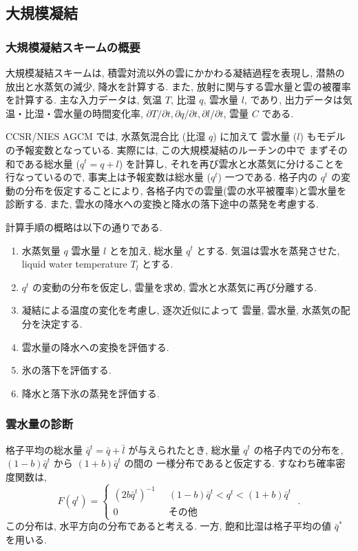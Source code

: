 ﻿
\subsection{大規模凝結}

\subsubsection{大規模凝結スキームの概要}

大規模凝結スキームは,
積雲対流以外の雲にかかわる凝結過程を表現し,
潜熱の放出と水蒸気の減少, 降水を計算する.
また, 放射に関与する雲水量と雲の被覆率を計算する.
主な入力データは, 気温 $T$, 比湿 $q$, 雲水量 $l$, であり,
出力データは気温・比湿・雲水量の時間変化率,
$\partial T/\partial t, \partial q/\partial t, \partial l/\partial t$,
雲量 $C$ である.

CCSR/NIES AGCM では, 水蒸気混合比 (比湿 $q$) に加えて
雲水量 ($l$) もモデルの予報変数となっている.
実際には, この大規模凝結のルーチンの中で
まずその和である総水量 ($q^t = q+l$) を計算し, 
それを再び雲水と水蒸気に分けることを行なっているので,
事実上は予報変数は総水量 ($q^t$) 一つである.
格子内の $q^t$ の変動の分布を仮定することにより,
各格子内での雲量(雲の水平被覆率)と雲水量を診断する.
また, 雲水の降水への変換と降水の落下途中の蒸発を考慮する.

計算手順の概略は以下の通りである.
%
\begin{enumerate}
\item 水蒸気量 $q$ 雲水量 $l$ とを加え,
      総水量 $q^t$ とする.
      気温は雲水を蒸発させた, 
      liquid water temperature  $T_l$ とする.
\item $q^t$ の変動の分布を仮定し,
      雲量を求め, 雲水と水蒸気に再び分離する.
\item 凝結による温度の変化を考慮し,
      逐次近似によって
      雲量, 雲水量, 水蒸気の配分を決定する.
\item 雲水量の降水への変換を評価する.
\item 氷の落下を評価する.
\item 降水と落下氷の蒸発を評価する.
\end{enumerate}

\subsubsection{雲水量の診断}

格子平均の総水量 $\bar{q}^t = \bar{q} + \bar{l}$ が与えられたとき,
総水量 $q^t$ の格子内での分布を,
$(1-b)\bar{q}^t$ から $(1+b)\bar{q}^t$ の間の
一様分布であると仮定する. すなわち確率密度関数は,
\begin{equation}
  F(q^t) = \left\{ 
           \begin{array}{ll}
             (2b\bar{q}^t)^{-1} \; \; &
                 (1-b)\bar{q}^t < q^t <  (1+b)\bar{q}^t \\
             0                        & その他
           \end{array}
           \right. \; .
\end{equation}
この分布は, 水平方向の分布であると考える.
一方, 飽和比湿は格子平均の値 $\bar{q}^*$ を用いる.

